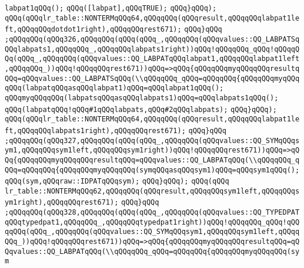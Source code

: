 \verb|labpat1qQQq();|\newline
\verb|qQQq([labpat],qQQqTRUE);|\newline
\verb|qQQq}qQQq);|\newline
\verb|qQQq(qQQqlr_table::NONTERMqQQq64,qQQqqQQq(qQQqresult,qQQqqQQqlabpat1left,qQQqqQQqdotdot1right),qQQqqQQqrest671);|\newline
\verb|qQQq}qQQq|\newline
\verb|;qQQqqQQq(qQQq326,qQQqqQQq(qQQq(qQQq_,qQQqqQQq(qQQqvalues::QQ_LABPATSqQQqlabpats1,qQQqqQQq_,qQQqqQQqlabpats1right))qQQq!qQQqqQQq_qQQq!qQQqqQQq(qQQq_,qQQqqQQq(qQQqvalues::QQ_LABPATqQQqlabpat1,qQQqqQQqlabpat1left,qQQqqQQq_))qQQq!qQQqqQQqrest671))qQQq=>qQQq{qQQqqQQqmyqQQqqQQqresultqQQq=qQQqvalues::QQ_LABPATSqQQq(\\qQQqqQQq_qQQq=qQQqqQQq{qQQqqQQqmyqQQq|\newline
\verb|qQQq(labpatqQQqasqQQqlabpat1)qQQq=qQQqlabpat1qQQq();|\newline
\verb|qQQqmyqQQqqQQq(labpatsqQQqasqQQqlabpats1)qQQq=qQQqlabpats1qQQq();|\newline
\verb|qQQq(labpatqQQq!qQQq#1qQQqlabpats,qQQq#2qQQqlabpats);|\newline
\verb|qQQq}qQQq);|\newline
\verb|qQQq(qQQqlr_table::NONTERMqQQq64,qQQqqQQq(qQQqresult,qQQqqQQqlabpat1left,qQQqqQQqlabpats1right),qQQqqQQqrest671);|\newline
\verb|qQQq}qQQq|\newline
\verb|;qQQqqQQq(qQQq327,qQQqqQQq(qQQq(qQQq_,qQQqqQQq(qQQqvalues::QQ_SYMqQQqsym1,qQQqqQQqsym1left,qQQqqQQqsym1right))qQQq!qQQqqQQqrest671))qQQq=>qQQq{qQQqqQQqmyqQQqqQQqresultqQQq=qQQqvalues::QQ_LABPATqQQq(\\qQQqqQQq_qQQq=qQQqqQQq{qQQqqQQqmyqQQqqQQq(symqQQqasqQQqsym1)qQQq=qQQqsym1qQQq();|\newline
\verb|qQQq(sym,qQQqraw::IDPATqQQqsym);|\newline
\verb|qQQq}qQQq);|\newline
\verb|qQQq(qQQq|\newline
\verb|lr_table::NONTERMqQQq62,qQQqqQQq(qQQqresult,qQQqqQQqsym1left,qQQqqQQqsym1right),qQQqqQQqrest671);|\newline
\verb|qQQq}qQQq|\newline
\verb|;qQQqqQQq(qQQq328,qQQqqQQq(qQQq(qQQq_,qQQqqQQq(qQQqvalues::QQ_TYPEDPATqQQqtypedpat1,qQQqqQQq_,qQQqqQQqtypedpat1right))qQQq!qQQqqQQq_qQQq!qQQqqQQq(qQQq_,qQQqqQQq(qQQqvalues::QQ_SYMqQQqsym1,qQQqqQQqsym1left,qQQqqQQq_))qQQq!qQQqqQQqrest671))qQQq=>qQQq{qQQqqQQqmyqQQqqQQqresultqQQq=qQQqvalues::QQ_LABPATqQQq(\\qQQqqQQq_qQQq=qQQqqQQq{qQQqqQQqmyqQQqqQQq(sym|\newline
